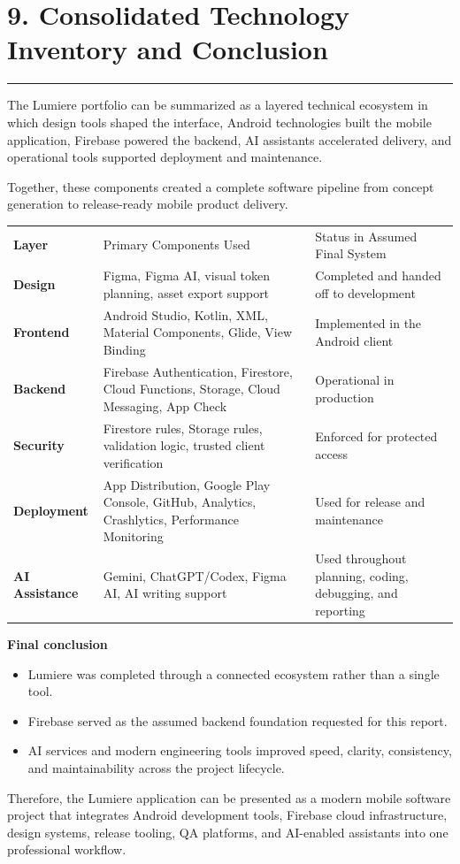 \documentclass[11pt,a4paper]{article}
\newcommand{\PageTitle}[1]{\section*{#1}\vspace{2pt}\textcolor{LumiereGold}{\rule{\textwidth}{1.1pt}}\vspace{6pt}}
\newcommand{\SmallSpace}{\vspace{4pt}}
\begin{document}
\newpage
\PageTitle{9. Consolidated Technology Inventory and Conclusion}

The Lumiere portfolio can be summarized as a layered technical ecosystem in which design tools shaped the interface, Android technologies built the mobile application, Firebase powered the backend, AI assistants accelerated delivery, and operational tools supported deployment and maintenance.

Together, these components created a complete software pipeline from concept generation to release-ready mobile product delivery.

\begin{tabularx}{\textwidth}{>{\bfseries}p{1.8cm} p{5.2cm} Y}
\color{white}Layer & \color{white}Primary Components Used & \color{white}Status in Assumed Final System \\
Design & Figma, Figma AI, visual token planning, asset export support & Completed and handed off to development \\
Frontend & Android Studio, Kotlin, XML, Material Components, Glide, View Binding & Implemented in the Android client \\
Backend & Firebase Authentication, Firestore, Cloud Functions, Storage, Cloud Messaging, App Check & Operational in production \\
Security & Firestore rules, Storage rules, validation logic, trusted client verification & Enforced for protected access \\
Deployment & App Distribution, Google Play Console, GitHub, Analytics, Crashlytics, Performance Monitoring & Used for release and maintenance \\
AI Assistance & Gemini, ChatGPT/Codex, Figma AI, AI writing support & Used throughout planning, coding, debugging, and reporting \\
\end{tabularx}

\SmallSpace
\begin{tcolorbox}[colback=LumiereCream,colframe=LumiereLine,boxrule=0.6pt,arc=2mm]
\textbf{\textcolor{LumiereDark}{Final conclusion}}
\begin{itemize}
\item Lumiere was completed through a connected ecosystem rather than a single tool.
\item Firebase served as the assumed backend foundation requested for this report.
\item AI services and modern engineering tools improved speed, clarity, consistency, and maintainability across the project lifecycle.
\end{itemize}
\end{tcolorbox}

Therefore, the Lumiere application can be presented as a modern mobile software project that integrates Android development tools, Firebase cloud infrastructure, design systems, release tooling, QA platforms, and AI-enabled assistants into one professional workflow.
\end{document}
